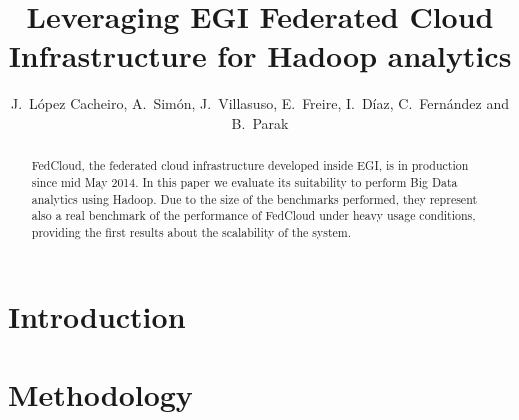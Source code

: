 \documentclass[oribibl]{llncs_Ibergrid2013}
\begin{document}
%
\frontmatter          %
%
\pagestyle{headings}  %
%
\mainmatter              %
%
\title{Leveraging EGI Federated Cloud Infrastructure for Hadoop analytics}
%
%
\author{J.~L\'opez Cacheiro, A.~Sim\'on, J.~Villasuso, E.~Freire, I.~D\'iaz, C.~Fern\'andez and B.~Parak}
%
%
%




\maketitle              %

\begin{abstract}
FedCloud, the federated cloud infrastructure developed inside EGI, is in production since mid May 2014. In this paper we evaluate its suitability to perform Big Data analytics using Hadoop. Due to the size of the benchmarks performed, they represent also a real benchmark of the performance of FedCloud under heavy usage conditions, providing the first results about the scalability of the system.


\end{abstract}

%
\section{Introduction}
\label{sect-introduction}


\section{Methodology}
\label{sect-methodology}

\end{document}

